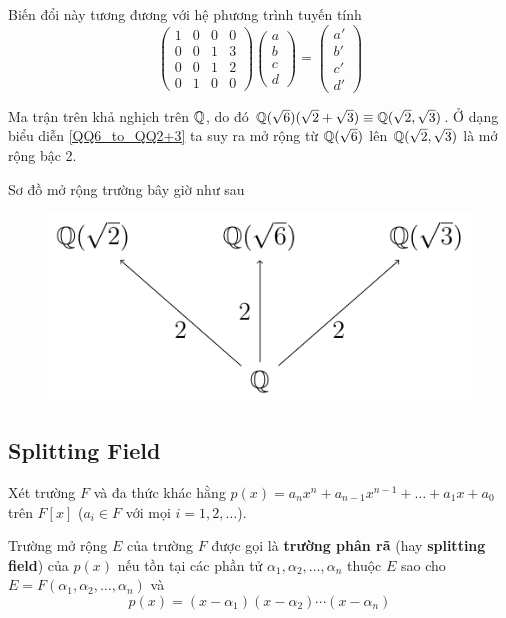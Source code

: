 Biến đổi này tương đương với hệ phương trình tuyến tính
\begin{equation*}
    \begin{pmatrix}
        1 & 0 & 0 & 0 \\
        0 & 0 & 1 & 3 \\
        0 & 0 & 1 & 2 \\
        0 & 1 & 0 & 0
    \end{pmatrix} \begin{pmatrix}
        a \\ b \\ c \\ d
    \end{pmatrix} = \begin{pmatrix}
        a' \\ b' \\ c' \\ d'
    \end{pmatrix}
\end{equation*}

Ma trận trên khả nghịch trên $\mathbb{Q}$, do đó $\mathbb{Q}(\sqrt{6})(\sqrt{2} + \sqrt{3}) \equiv \mathbb{Q}(\sqrt{2}, \sqrt{3})$. Ở dạng biểu diễn \ref{QQ6_to_QQ2+3} ta suy ra mở rộng từ $\mathbb{Q}(\sqrt{6})$ lên $\mathbb{Q}(\sqrt{2}, \sqrt{3})$ là mở rộng bậc 2.

Sơ đồ mở rộng trường bây giờ như sau

\begin{figure}[htb]
    \centering
    \includegraphics[page=2]{extension_field.pdf}
\end{figure}

\subsection*{Splitting Field}

\begin{definition}
    Xét trường $F$ và đa thức khác hằng $p(x) = a_n x^n + a_{n-1} x^{n-1} + \ldots + a_1 x + a_0$ trên $F[x]$ ($a_i \in F$ với mọi $i = 1, 2, \ldots$).

    Trường mở rộng $E$ của trường $F$ được gọi là \textbf{trường phân rã} (hay \textbf{splitting field}) của $p(x)$ nếu tồn tại các phần tử $\alpha_1, \alpha_2, \ldots, \alpha_n$ thuộc $E$ sao cho $E = F(\alpha_1, \alpha_2, \ldots, \alpha_n)$ và
    \begin{equation*}
        p(x) = (x - \alpha_1) (x - \alpha_2) \cdots (x - \alpha_n)
    \end{equation*}
\end{definition}

